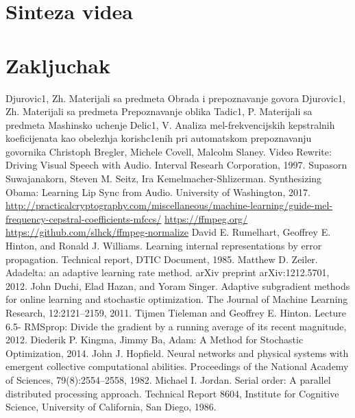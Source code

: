 \documentclass[a4paper, openany, oneside, 11pt]{book}
\begin{document}
\chapter{Sinteza videa}
\chapter{Zakljuchak}


\begin{thebibliography}{99}
Djurovic1, Zh. Materijali sa predmeta Obrada i prepoznavanje govora
Djurovic1, Zh. Materijali sa predmeta Prepoznavanje oblika
Tadic1, P. Materijali sa predmeta Mashinsko uchenje
Delic1, V. Analiza mel-frekvencijskih kepstralnih koeficijenata kao obelezhja korish\-c1enih pri automat\-skom prepoznavanju govornika
\selectfont
{}
Christoph Bregler, Michele Covell, Malcolm Slaney. Video Rewrite: Driving Visual Speech with Audio. Interval Researh Corporation, 1997.
Supasorn Suwajanakorn, Steven M. Seitz, Ira Kemelmacher-Shlizerman. Synthesizing Obama: Learning Lip Sync from Audio. University of Washington, 2017.
\url{http://practicalcryptography.com/miscellaneous/machine-learning/guide-mel-frequency-cepstral-coefficients-mfccs/}
\url{https://ffmpeg.org/}
\url{https://github.com/slhck/ffmpeg-normalize}
David E. Rumelhart, Geoffrey E. Hinton, and Ronald J. Williams. Learning
internal representations by error propagation. Technical report, DTIC Document, 1985.
Matthew D. Zeiler. Adadelta: an adaptive learning rate method. arXiv preprint arXiv:1212.5701, 2012.
John Duchi, Elad Hazan, and Yoram Singer. Adaptive subgradient methods for
online learning and stochastic optimization. The Journal of Machine Learning Research, 12:2121–2159, 2011.
Tijmen Tieleman and Geoffrey E. Hinton. Lecture 6.5- RMSprop: Divide
the gradient by a running average of its recent magnitude, 2012.
Diederik P. Kingma, Jimmy Ba, Adam: A Method for Stochastic Optimization, 2014.
John J. Hopfield. Neural networks and physical systems with emergent collective
computational abilities. Proceedings of the National Academy of Sciences, 79(8):2554–2558, 1982.
Michael I. Jordan. Serial order: A parallel distributed processing approach.
Technical Report 8604, Institute for Cognitive Science, University of California, San Diego, 1986.

\end{thebibliography}
\end{document}
